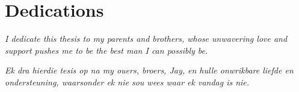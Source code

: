 \chapter{Dedications}%

\vfill
\begin{center}\itshape%
  I dedicate this thesis to my parents and brothers, whose unwavering love and support pushes me to be the best man I can possibly be. 
\end{center}
\vfill

\vfill
\begin{Afr}
  \begin{center}\itshape%
    Ek dra hierdie tesis op na my ouers, broers, Jay, en hulle onwrikbare liefde en ondersteuning, waarsonder ek nie sou wees waar ek vandag is nie. 
  \end{center}
\end{Afr}
\vfill
\clearpage
	   
\endinput
